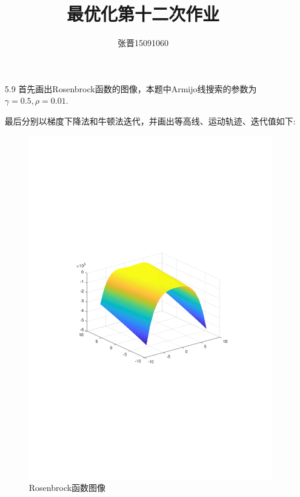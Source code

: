 \documentclass[UTF8]{ctexart}
\title{\heiti 最优化第十二次作业}
\author{\kaishu 张晋15091060}
\begin{document}
\maketitle

\begin{enumerate}
\item[5.9] 首先画出Rosenbrock函数的图像，本题中Armijo线搜索的参数为$\gamma=0.5,\rho=0.01$.

最后分别以梯度下降法和牛顿法迭代，并画出等高线、运动轨迹、迭代值如下:

\begin{figure}[H]
\centering
\includegraphics[width=12cm]{fig/0_1.pdf}
\caption{Rosenbrock函数图像}
\end{figure}


\end{enumerate}
\end{document}
